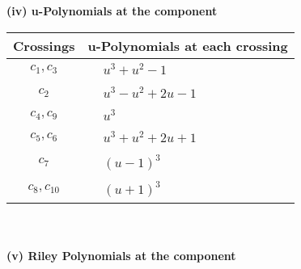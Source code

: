 \documentclass[1p]{elsarticle_modified}
\theoremstyle{definition}
\begin{document}
\newpage\renewcommand{\arraystretch}{1}
\flushleft \textbf{(iv) u-Polynomials at the component}\newline \\
\begin{tabular}{m{50pt}|m{274pt}}
Crossings & \hspace{64pt}u-Polynomials at each crossing \\
\hline $$\begin{aligned}c_{1},c_{3}\end{aligned}$$&$\begin{aligned}
&u^3+u^2-1
\end{aligned}$\\
\hline $$\begin{aligned}c_{2}\end{aligned}$$&$\begin{aligned}
&u^3- u^2+2 u-1
\end{aligned}$\\
\hline $$\begin{aligned}c_{4},c_{9}\end{aligned}$$&$\begin{aligned}
&u^3
\end{aligned}$\\
\hline $$\begin{aligned}c_{5},c_{6}\end{aligned}$$&$\begin{aligned}
&u^3+u^2+2 u+1
\end{aligned}$\\
\hline $$\begin{aligned}c_{7}\end{aligned}$$&$\begin{aligned}
&(u-1)^3
\end{aligned}$\\
\hline $$\begin{aligned}c_{8},c_{10}\end{aligned}$$&$\begin{aligned}
&(u+1)^3
\end{aligned}$\\
\hline
\end{tabular}\\~\\
\newpage\renewcommand{\arraystretch}{1}
\flushleft \textbf{(v) Riley Polynomials at the component}\newline \\
\end{document}
